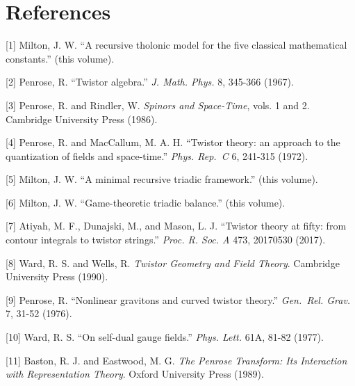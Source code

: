 \documentclass[12pt]{article}
\begin{document}
\section{References}\label{references}

{[}1{]} Milton, J. W. ``A recursive tholonic model for the five
classical mathematical constants.'' (this volume).

{[}2{]} Penrose, R. ``Twistor algebra.'' \emph{J. Math. Phys.} 8,
345-366 (1967).

{[}3{]} Penrose, R. and Rindler, W. \emph{Spinors and Space-Time}, vols.
1 and 2. Cambridge University Press (1986).

{[}4{]} Penrose, R. and MacCallum, M. A. H. ``Twistor theory: an
approach to the quantization of fields and space-time.'' \emph{Phys.
Rep.~C} 6, 241-315 (1972).

{[}5{]} Milton, J. W. ``A minimal recursive triadic framework.'' (this
volume).

{[}6{]} Milton, J. W. ``Game-theoretic triadic balance.'' (this volume).

{[}7{]} Atiyah, M. F., Dunajski, M., and Mason, L. J. ``Twistor theory
at fifty: from contour integrals to twistor strings.'' \emph{Proc. R.
Soc. A} 473, 20170530 (2017).

{[}8{]} Ward, R. S. and Wells, R. \emph{Twistor Geometry and Field
Theory}. Cambridge University Press (1990).

{[}9{]} Penrose, R. ``Nonlinear gravitons and curved twistor theory.''
\emph{Gen.~Rel. Grav.} 7, 31-52 (1976).

{[}10{]} Ward, R. S. ``On self-dual gauge fields.'' \emph{Phys. Lett.}
61A, 81-82 (1977).

{[}11{]} Baston, R. J. and Eastwood, M. G. \emph{The Penrose Transform:
Its Interaction with Representation Theory}. Oxford University Press
(1989).
\end{document}
